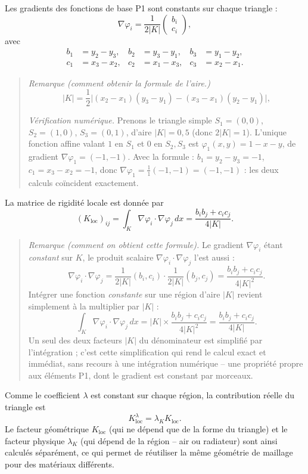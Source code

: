 \documentclass[12pt,a4paper]{article}
\begin{document}
	Les gradients des fonctions de base P1 sont constants sur chaque
	triangle :
	\[
	\nabla\varphi_i
	=
	\frac{1}{2|K|}
	\begin{pmatrix}
		b_i\\
		c_i
	\end{pmatrix},
	\]
	avec
	\[
	\begin{aligned}
		b_1&=y_2-y_3,
		&
		b_2&=y_3-y_1,
		&
		b_3&=y_1-y_2,
		\\
		c_1&=x_3-x_2,
		&
		c_2&=x_1-x_3,
		&
		c_3&=x_2-x_1.
	\end{aligned}
	\]
	
	\begin{quote}
		\small\emph{Remarque (comment obtenir la formule de l'aire.)}
		\[
		|K|=\frac{1}{2}\big|(x_2-x_1)(y_3-y_1)-(x_3-x_1)(y_2-y_1)\big|,
		\]
		
		
		\emph{Vérification numérique.} Prenons le triangle simple $S_1=(0,0)$, $S_2=(1,0)$, $S_3=(0,1)$, d'aire $|K|=0{,}5$ (donc $2|K|=1$). L'unique fonction affine valant $1$ en $S_1$ et $0$ en $S_2,S_3$ est $\varphi_1(x,y)=1-x-y$, de gradient $\nabla\varphi_1=(-1,-1)$. Avec la formule : $b_1=y_2-y_3=-1$, $c_1=x_3-x_2=-1$, donc $\nabla\varphi_1=\frac{1}{1}(-1,-1)=(-1,-1)$ : les deux calculs coïncident exactement.
	\end{quote}
	
	La matrice de rigidité locale est donnée par
	\[
	(K_{\mathrm{loc}})_{ij}
	=
	\int_K
	\nabla\varphi_i\cdot\nabla\varphi_j\,dx
	=
	\frac{b_ib_j+c_ic_j}{4|K|}.
	\]
	
	\begin{quote}
		\small\emph{Remarque (comment on obtient cette formule).} Le gradient $\nabla\varphi_i$ étant \emph{constant} sur $K$, le produit scalaire $\nabla\varphi_i\cdot\nabla\varphi_j$ l'est aussi :
		\[
		\nabla\varphi_i\cdot\nabla\varphi_j=\frac{1}{2|K|}(b_i,c_i)\cdot\frac{1}{2|K|}(b_j,c_j)=\frac{b_ib_j+c_ic_j}{4|K|^2}.
		\]
		Intégrer une fonction \emph{constante} sur une région d'aire $|K|$ revient simplement à la multiplier par $|K|$ :
		\[
		\int_K \nabla\varphi_i\cdot\nabla\varphi_j\,dx = |K|\times\frac{b_ib_j+c_ic_j}{4|K|^2}=\frac{b_ib_j+c_ic_j}{4|K|}.
		\]
		Un seul des deux facteurs $|K|$ du dénominateur est simplifié par l'intégration ; c'est cette simplification qui rend le calcul exact et immédiat, sans recours à une intégration numérique -- une propriété propre aux éléments P1, dont le gradient est constant par morceaux.
	\end{quote}
	
	Comme le coefficient $\lambda$ est constant sur chaque région, la
	contribution réelle du triangle est
	\[
	K_{\mathrm{loc}}^{\lambda}
	=
	\lambda_K K_{\mathrm{loc}}.
	\]
	Le facteur géométrique $K_{\mathrm{loc}}$ (qui ne dépend que de la forme du triangle) et le facteur physique $\lambda_K$ (qui dépend de la région -- air ou radiateur) sont ainsi calculés séparément, ce qui permet de réutiliser la même géométrie de maillage pour des matériaux différents.
	
\end{document}
